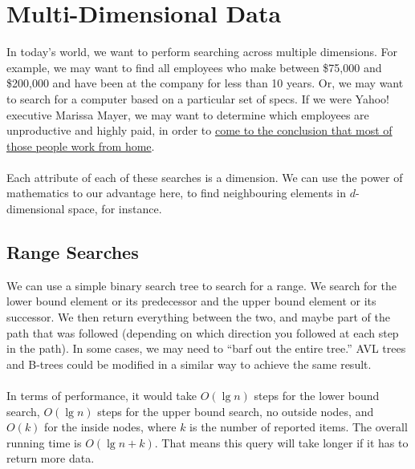 \documentclass[]{article}
\theoremstyle{definition}
\begin{document}
	\section{Multi-Dimensional Data}
		In today's world, we want to perform searching across multiple dimensions. For example, we may want to find all employees who make between \$75,000 and \$200,000 and have been at the company for less than 10 years. Or, we may want to search for a computer based on a particular set of specs. If we were Yahoo! executive Marissa Mayer, we may want to determine which employees are unproductive and highly paid, in order to \href{http://allthingsd.com/20130222/physically-together-heres-the-internal-yahoo-no-work-from-home-memo-which-extends-beyond-remote-workers/}{come to the conclusion that most of those people work from home}.
		\\ \\
		Each attribute of each of these searches is a dimension. We can use the power of mathematics to our advantage here, to find neighbouring elements in $d$-dimensional space, for instance.
		
		\subsection{Range Searches}
			We can use a simple binary search tree to search for a range. We search for the lower bound element or its predecessor and the upper bound element or its successor. We then return everything between the two, and maybe part of the path that was followed (depending on which direction you followed at each step in the path). In some cases, we may need to ``barf out the entire tree.'' AVL trees and B-trees could be modified in a similar way to achieve the same result.
			\\ \\
			In terms of performance, it would take $O(\lg n)$ steps for the lower bound search, $O(\lg n)$ steps for the upper bound search, no outside nodes, and $O(k)$ for the inside nodes, where $k$ is the number of reported items. The overall running time is $O(\lg n + k)$. That means this query will take longer if it has to return more data.
\end{document}
